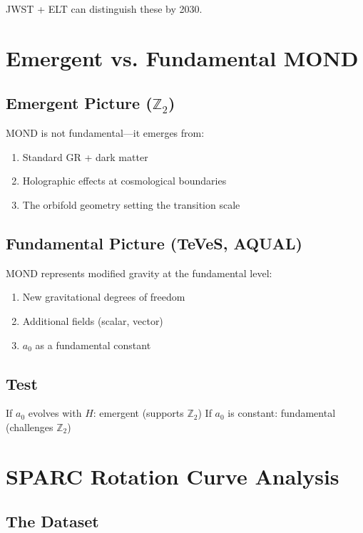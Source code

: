 \documentclass[12pt,a4paper]{article}
\begin{document}
JWST + ELT can distinguish these by 2030.

\section{Emergent vs. Fundamental MOND}

\subsection{Emergent Picture ($\mathbb{Z}_2$)}

MOND is not fundamental---it emerges from:
\begin{enumerate}
    \item Standard GR + dark matter
    \item Holographic effects at cosmological boundaries
    \item The orbifold geometry setting the transition scale
\end{enumerate}

\subsection{Fundamental Picture (TeVeS, AQUAL)}

MOND represents modified gravity at the fundamental level:
\begin{enumerate}
    \item New gravitational degrees of freedom
    \item Additional fields (scalar, vector)
    \item $a_0$ as a fundamental constant
\end{enumerate}

\subsection{Test}

If $a_0$ evolves with $H$: emergent (supports $\mathbb{Z}_2$)
If $a_0$ is constant: fundamental (challenges $\mathbb{Z}_2$)

\section{SPARC Rotation Curve Analysis}

\subsection{The Dataset}
\end{document}

